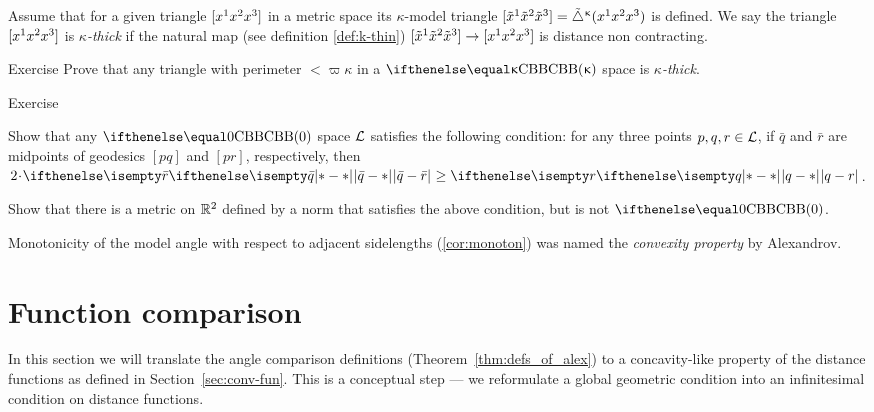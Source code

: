 {\sloppy

Assume that for a given triangle $[{x^1}{x^2}{x^3}]$ in a metric space its $\kappa$-model triangle
$\trig{\tilde x^1}{\tilde x^2}{\tilde x^3}\z=\modtrig\kappa({x^1}{x^2}{x^3})$ is defined.
We say the triangle $[{x^1}{x^2}{x^3}]$ is \emph{$\kappa$-thick}  if the natural map (see definition \ref{def:k-thin}) 
$\trig{\tilde x^1}{\tilde x^2}{\tilde x^3}\to \trig{x^1}{x^2}{x^3}$ is distance non contracting.

}

\begin{thm}{Exercise}\label{ex:fat-triangle}
Prove that any triangle with perimeter $<\varpi\kappa$ 
in a $\Alex{\kappa}$ space is \emph{$\kappa$-thick}.
\end{thm} 

\begin{thm}{Exercise}\label{ex:busemann}

\begin{subthm}{}
Show that any $\Alex0$ space $\mathcal{L}$ satisfies the following condition:
for any three points $p,q,r\in \spc{L}$, if $\bar q$ and $\bar r$ are midpoints of geodesics $[p q]$ and $[p r]$, respectively, then $2\cdot\dist[{{}}]{\bar q}{\bar r}{}\ge\dist{q}{r}{}$.
\end{subthm}

\begin{subthm}{} Show that there is a metric on $\mathbb{R}^2$ defined by a norm that satisfies the above condition, but is not $\Alex0$.
\end{subthm}

\end{thm}

Monotonicity of the model angle with respect to adjacent sidelengths (\ref{cor:monoton}) was named the \emph{convexity property} by Alexandrov.


\section{Function comparison} \label{sec:func-comp-CBB}

In this section we will translate the angle comparison definitions (Theorem~\ref{thm:defs_of_alex}) 
to a concavity-like property of the distance functions as defined in Section~\ref{sec:conv-fun}.
This is a conceptual step ---
we reformulate a global geometric condition into an infinitesimal condition on distance functions.


